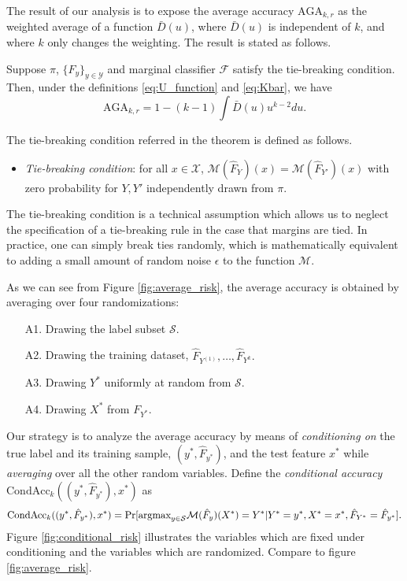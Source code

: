 \documentclass[12pt]{article}
\begin{document}
The result of our analysis is to expose the average accuracy
$\text{AGA}_{k, r}$ as the weighted average of a function
$\bar{D}(u)$, where $\bar{D}(u)$ is independent of $k$, and where $k$
only changes the weighting.  The result is stated as follows.

\begin{theorem}\label{theorem:avrisk_identity}
Suppose $\pi$, $\{F_y\}_{y \in \mathcal{Y}}$ and marginal classifier
$\mathcal{F}$ satisfy the tie-breaking condition.  Then, under the
definitions \eqref{eq:U_function} and \eqref{eq:Kbar}, we have
\begin{equation}\label{eq:avrisk_identity}
\text{AGA}_{k, r} = 1 - (k-1) \int \bar{D}(u) u^{k-2} du.
\end{equation}
\end{theorem}

The tie-breaking condition referred in the theorem is defined as follows.
\begin{itemize}
\item 
\emph{Tie-breaking condition}: for all $x \in \mathcal{X}$,
$\mathcal{M}(\hat{F}_Y)(x) = \mathcal{M}(\hat{F}_{Y'})(x)$
with zero probability for $Y, Y'$ independently drawn from $\pi$.
\end{itemize}
The tie-breaking condition is a technical assumption which allows us
to neglect the specification of a tie-breaking rule in the case that
margins are tied.  In practice, one can simply break ties randomly,
which is mathematically equivalent to adding a small amount of random
noise $\epsilon$ to the function $\mathcal{M}$.

As we can see from Figure \ref{fig:average_risk}, the average accuracy is
obtained by averaging over four randomizations:
\begin{enumerate}
\item[A1.] Drawing the label subset $\mathcal{S}$.
\item[A2.] Drawing the training dataset, $\hat{F}_{Y^{(1)}},\hdots, \hat{F}_{Y^{k}}.$
\item[A3.] Drawing $Y^*$ uniformly at random from $\mathcal{S}$.
\item[A4.] Drawing $X^*$ from $F_{Y^*}$.
\end{enumerate}


Our strategy is to analyze the average accuracy by
means of \emph{conditioning on} the true label and its training
sample, $(y^*, \hat{F}_{y^*})$, and the test feature $x^*$
while \emph{averaging} over all the other random variables.  Define
the \emph{conditional accuracy} $\text{CondAcc}_k((y^*, \hat{F}_{y^*}), x^*)$ as
\[
\text{CondAcc}_k((y^*, \hat{F}_{y^*}), x^*) = \Pr[\text{argmax}_{y \in \mathcal{S}} \mathcal{M}(\hat{F}_y)(X^*) = Y^* |Y^*=y^*, X^* = x^*, \hat{F}_{Y^*} = \hat{F}_{y^*}].
\]
Figure \ref{fig:conditional_risk} illustrates the variables which are
fixed under conditioning and the variables which are randomized.
Compare to figure \ref{fig:average_risk}.
\end{document}
